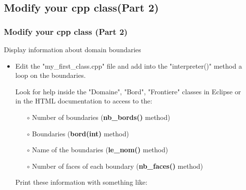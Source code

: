 \documentclass[10pt, hyperref={unicode=true,pdfusetitle, bookmarks=true,bookmarksnumbered=false,bookmarksopen=false, breaklinks=false,pdfborder={0 0 1},backref=true,colorlinks=true,linkcolor=darkblue,pageanchor, urlcolor=darkblue}]{beamer}
\begin{document}
\subsection{{\bf{Modify your cpp class(Part 2)}}}
\begin{frame}
\frametitle{Modify your cpp class (Part 2)}
\begin{block}{Display information about domain boundaries}

\begin{itemize}

\item Edit the "my\_first\_class.cpp" file and add into the "interpreter()" method a loop on the boundaries.

Look for help inside the "Domaine", "Bord", "Frontiere" classes in Eclipse or in the HTML documentation to access to the:
    \begin{itemize}
    \item [$\circ$] Number of boundaries (\textbf{nb\_bords()} method)
    \item [$\circ$] Boundaries (\textbf{bord(int)} method)
    \item [$\circ$] Name of the boundaries (\textbf{le\_nom()} method)
    \item [$\circ$] Number of faces of each boundary (\textbf{nb\_faces()} method)
    \end{itemize}

Print these information with something like:
\begin{center}
\end{center}
\end{itemize}

\end{block}
\end{frame}
\end{document}
